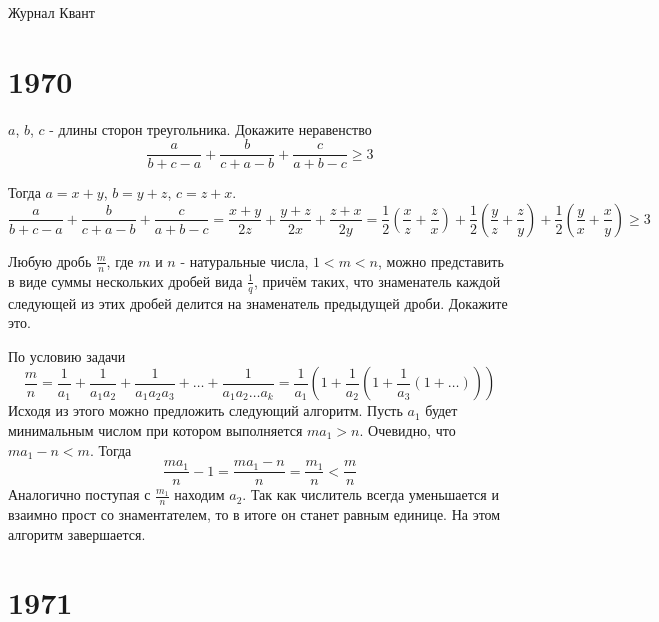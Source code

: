 \documentclass[11pt, a4paper]{problems_template}
\begin{document}
\begin{titlepage}
  \begin{center}
	\Huge{Журнал Квант}
  \end{center}
\end{titlepage} 

\chapter{1970}

\begin{exercise}[7]
$a$, $b$, $c$ - длины сторон треугольника. Докажите неравенство
$$
\frac{a}{b + c - a} + \frac{b}{c + a - b} + \frac{c}{a + b - c} \geqslant 3
$$
\end{exercise}

\begin{Solution}
Тогда $a = x + y$, $b = y + z$, $c = z + x$.
$$
\frac{a}{b + c - a} + \frac{b}{c + a - b} + \frac{c}{a + b - c} = \frac{x + y}{2z} + \frac{y + z}{2x} + \frac{z + x}{2y} = \frac{1}{2}\left( \frac{x}{z} + \frac{z}{x} \right) + \frac{1}{2} \left( \frac{y}{z} + \frac{z}{y} \right) + \frac{1}{2}\left( \frac{y}{x} + \frac{x}{y} \right) \geqslant 3
$$
\end{Solution}

\begin{exercise}[24]
Любую дробь $\frac{m}{n}$, где $m$ и $n$ - натуральные числа, $1 < m < n$, можно представить в виде суммы нескольких дробей вида $\frac{1}{q}$, причём таких, что знаменатель каждой следующей из этих дробей делится на знаменатель предыдущей дроби. Докажите это.
\end{exercise}

\begin{Solution}
По условию задачи
$$
\frac{m}{n} = \frac{1}{a_{1}} + \frac{1}{a_{1}a_{2}} + \frac{1}{a_{1}a_{2}a_{3}} + \dots + \frac{1}{a_{1}a_{2}\dots a_{k}} = \frac{1}{a_{1}} \left( 1 + \frac{1}{a_{2}} \left( 1 + \frac{1}{a_{3}} (1 + \dots ) \right) \right)
$$
Исходя из этого можно предложить следующий алгоритм. Пусть $a_{1}$ будет  минимальным числом при котором выполняется $ma_{1} > n$. Очевидно, что $ma_{1} - n < m$. Тогда 
$$
\frac{ma_{1}}{n} - 1 = \frac{ma_{1}-n}{n} = \frac{m_{1}}{n} < \frac{m}{n}
$$
Аналогично поступая с $\frac{m_{1}}{n}$ находим $a_{2}$. Так как числитель всегда уменьшается и взаимно прост со знаментателем, то в итоге он станет равным единице. На этом алгоритм завершается. 
\end{Solution}

\chapter{1971}
\end{document}
